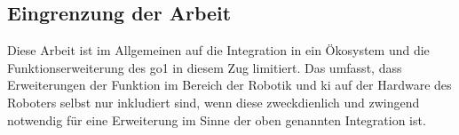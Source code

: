 \subsection{Eingrenzung der Arbeit} %
Diese Arbeit ist im Allgemeinen auf die Integration in ein Ökosystem und die Funktionserweiterung des \gls{go1} in diesem Zug limitiert.
Das umfasst, dass Erweiterungen der Funktion im Bereich der Robotik und \gls{ki} auf der Hardware des Roboters selbst nur inkludiert sind, wenn
diese zweckdienlich und zwingend notwendig für eine Erweiterung im Sinne der oben genannten Integration ist.

